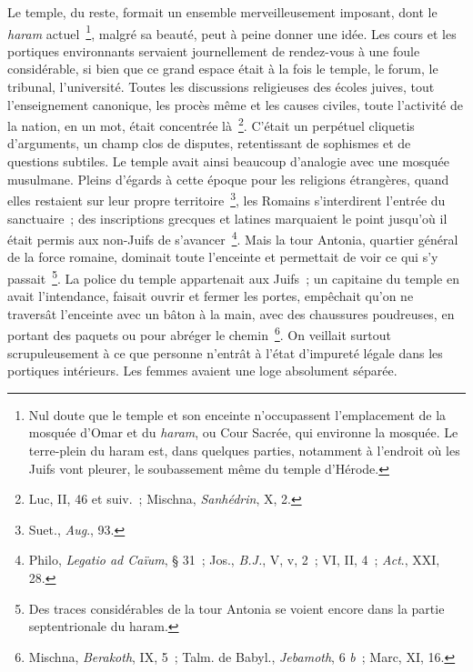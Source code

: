 \documentclass[french,twoside]{book} %
\begin{document}
Le temple, du reste, formait un ensemble merveilleusement imposant, dont le {\itshape haram} actuel \footnote{ Nul doute que le temple et son enceinte n’occupassent l’emplacement de la mosquée d’Omar et du {\itshape haram}, ou Cour Sacrée, qui environne la mosquée. Le terre-plein du haram est, dans quelques parties, notamment à l’endroit où les Juifs vont pleurer, le soubassement même du temple d’Hérode.}, malgré sa beauté, peut à peine donner une idée. Les cours et les portiques environnants servaient journellement de rendez-vous à une foule considérable, si bien que ce grand espace était à la fois le temple, le forum, le tribunal, l’université. Toutes les discussions religieuses des écoles juives, tout l’enseignement canonique, les procès même et les causes civiles, toute l’activité de la nation, en un mot, était concentrée là \footnote{ Luc, II, 46 et suiv. ; Mischna, {\itshape Sanhédrin}, X, 2.}. C’était un perpétuel cliquetis d’arguments, un champ clos de disputes, retentissant de sophismes et de questions subtiles. Le temple avait ainsi beaucoup d’analogie avec une mosquée musulmane. Pleins d’égards à cette époque pour les religions étrangères, quand elles restaient sur leur propre territoire \footnote{ Suet., {\itshape Aug}., 93.}, les Romains s’interdirent l’entrée du sanctuaire ; des inscriptions grecques et latines marquaient le point jusqu’où il était permis aux non-Juifs de s’avancer \footnote{ Philo, {\itshape Legatio ad Caïum}, § 31 ; Jos., {\itshape B.J.}, V, v, 2 ; VI, II, 4 ; {\itshape Act}., XXI, 28.}. Mais la tour Antonia, quartier général de la force romaine, dominait toute l’enceinte et permettait de voir ce qui s’y passait \footnote{Des traces considérables de la tour Antonia se voient encore dans la partie septentrionale du haram.}. La police du temple appartenait aux Juifs ; un capitaine du temple en avait l’intendance, faisait ouvrir et fermer les portes, empêchait qu’on ne traversât l’enceinte avec un bâton à la main, avec des chaussures poudreuses, en portant des paquets ou pour abréger le chemin \footnote{ Mischna, {\itshape Berakoth}, IX, 5 ; Talm. de Babyl., {\itshape Jebamoth}, 6 {\itshape b} ; Marc, XI, 16.}. On veillait surtout scrupuleusement à ce que personne n’entrât à l’état d’impureté légale dans les portiques intérieurs. Les femmes avaient une loge absolument séparée.\par
\end{document}
